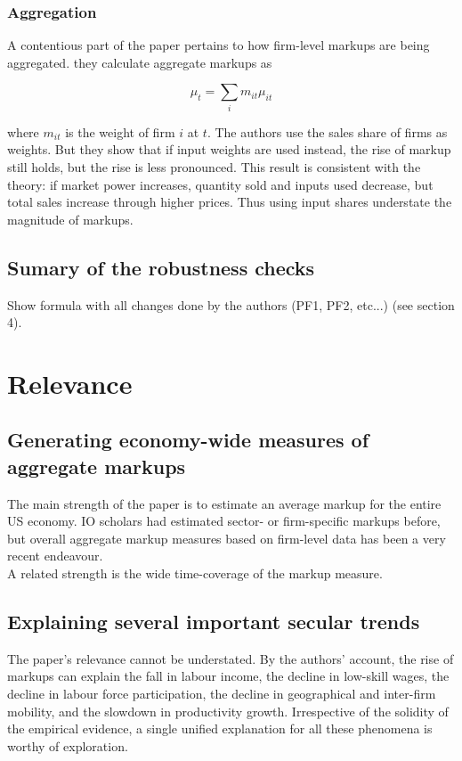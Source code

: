 \documentclass{amsart}
\theoremstyle{definition}
\theoremstyle{remark}
\numberwithin{equation}{section}
\begin{document}
\subsubsection{Aggregation} A contentious part of the paper pertains to how firm-level markups are being aggregated. they calculate aggregate markups as

$$ \mu_{t}=\sum_{i} m_{i t} \mu_{i t} $$ 

where $m_{it}$ is the weight of firm $i$ at $t$. The authors use the sales share of firms as weights. But they show that if input weights are used instead, the rise of markup still holds, but the rise is less pronounced. This result is consistent with the theory: if market power increases, quantity sold and inputs used decrease, but total sales increase through higher prices. Thus using input shares understate the magnitude of markups.\\

\subsection*{Sumary of the robustness checks} Show formula with all changes done by the authors (PF1, PF2, etc...) (see section 4).

\section{Relevance}

\subsection*{Generating economy-wide measures of aggregate markups} The main strength of the paper is to estimate an average markup for the entire US economy. IO scholars had estimated sector- or firm-specific markups before, but overall aggregate markup measures based on firm-level data has been a very recent endeavour.\\

A related strength is the wide time-coverage of the markup measure.\\

\subsection*{Explaining several important secular trends} The paper's relevance cannot be understated. By the authors' account, the rise of markups can explain the fall in labour income, the decline in low-skill wages, the decline in labour force participation, the decline in geographical and inter-firm mobility, and the slowdown in productivity growth. Irrespective of the solidity of the empirical evidence, a single unified explanation for all these phenomena is worthy of exploration. \\
\end{document}
